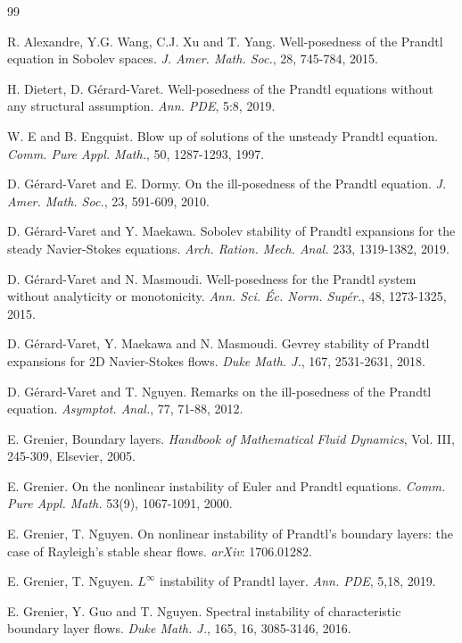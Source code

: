 \documentclass{amsart}
\numberwithin{equation}{section}
\begin{document}
\begin{thebibliography}{99}

R. Alexandre, Y.G. Wang, C.J. Xu and T. Yang. Well-posedness of the Prandtl equation in Sobolev spaces. {\it J. Amer. Math. Soc.}, 28, 745-784, 2015.

H. Dietert, D. G\'{e}rard-Varet. Well-posedness of the Prandtl equations without any structural assumption. {\it Ann. PDE}, 5:8, 2019.

W. E and B. Engquist. Blow up of solutions of the unsteady Prandtl equation. {\it Comm. Pure Appl. Math.}, 50, 1287-1293, 1997.


D. G\'{e}rard-Varet and E. Dormy. On the ill-posedness of the Prandtl equation. {\it J. Amer. Math. Soc.}, 23, 591-609, 2010.

D. G\'{e}rard-Varet and Y. Maekawa. Sobolev stability of Prandtl expansions for the steady Navier-Stokes equations. {\it Arch. Ration. Mech. Anal.} 233, 1319-1382, 2019.

D. G\'{e}rard-Varet and N. Masmoudi. Well-posedness for the Prandtl system without analyticity or monotonicity. {\it Ann. Sci. \'{E}c. Norm. Sup\'{e}r.}, 48, 1273-1325, 2015.

D. G\'{e}rard-Varet, Y. Maekawa and N. Masmoudi. Gevrey stability of Prandtl expansions for 2D Navier-Stokes flows. {\it Duke Math. J.}, 167, 2531-2631, 2018.

D. G\'{e}rard-Varet and T. Nguyen. Remarks on the ill-posedness of the Prandtl equation. {\it Asymptot. Anal.}, 77, 71-88, 2012.


E. Grenier, Boundary layers. {\it Handbook of Mathematical Fluid Dynamics}, Vol. III, 245-309, Elsevier, 2005.

E. Grenier. On the nonlinear instability of Euler and Prandtl equations. {\it Comm. Pure Appl. Math.} 53(9), 1067-1091, 2000.

E. Grenier, T. Nguyen. On nonlinear instability of Prandtl's boundary layers: the case of Rayleigh's stable shear flows. {\it arXiv}: 1706.01282.

E. Grenier, T. Nguyen. $L^{\infty}$ instability of Prandtl layer. {\it Ann. PDE}, 5,18, 2019.

E. Grenier, Y. Guo and T. Nguyen. Spectral instability of characteristic boundary layer flows. {\it Duke Math. J.}, 165, 16, 3085-3146, 2016.


\end{thebibliography}
\end{document}
